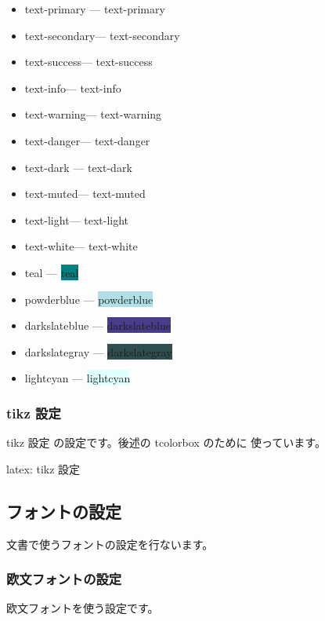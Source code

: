 \documentclass[dvipdfmx,a4j,14pt,uplatex]{jsarticle}
\begin{document}
\begin{itemize}
\item text-primary --- \colorbox{text-primary}{text-primary}
\item text-secondary--- \colorbox{text-secondary}{text-secondary}
\item text-success--- \colorbox{text-success}{text-success}
\item text-info--- \colorbox{text-info}{text-info}
\item text-warning--- \colorbox{text-warning}{text-warning}
\item text-danger--- \colorbox{text-danger}{text-danger}
\item text-dark --- \colorbox{text-dark}{text-dark}
\item text-muted--- \colorbox{text-muted}{text-muted}
\item text-light--- \colorbox{text-light}{text-light}
\item text-white--- \colorbox{text-white}{text-white}
\item teal        --- \colorbox{teal}{teal}
\item powderblue  --- \colorbox{powderblue}{powderblue}
\item darkslateblue  --- \colorbox{darkslateblue}{darkslateblue}
\item darkslategray  --- \colorbox{darkslategray}{darkslategray}
\item lightcyan  --- \colorbox{lightcyan}{lightcyan}
\end{itemize}

\subsubsection{tikz 設定}
\label{sec:org51c67b2}
tikz 設定 の設定です。後述の tcolorbox のために
使っています。

\begin{programlist}[label={orgd7b5eb8}]{latex}{: tikz 設定}%
\usepackage{tikz}
\usetikzlibrary{shadings,shadows}
\usetikzlibrary{decorations.pathmorphing}
\usetikzlibrary{patterns}
\usetikzlibrary{spy}
\usetikzlibrary{arrows.meta}
\end{programlist}

\subsection{フォントの設定}
\label{sec:org9cd3a9e}
文書で使うフォントの設定を行ないます。

\subsubsection{欧文フォントの設定}
\label{sec:orgf25c4c8}
欧文フォントを使う設定です。
\end{document}
